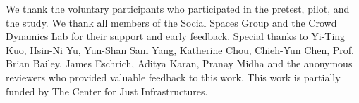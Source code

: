 \begin{acks}
We thank the voluntary participants who participated in the pretest, pilot, and the study. We thank all members of the Social Spaces Group and the Crowd Dynamics Lab for their support and early feedback. Special thanks to Yi-Ting Kuo, Hsin-Ni Yu, Yun-Shan Sam Yang, Katherine Chou, Chieh-Yun Chen, Prof. Brian Bailey, James Eschrich, Aditya Karan, Pranay Midha and the anonymous reviewers who provided valuable feedback to this work. This work is partially funded by The Center for Just Infrastructures.
\end{acks}